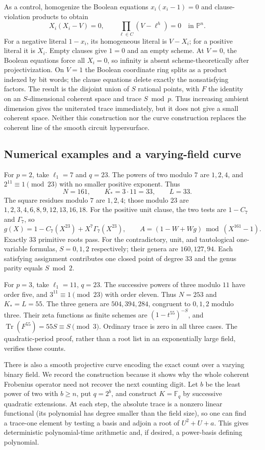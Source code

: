 As a control, homogenize the Boolean equations $x_i(x_i-1)=0$ and clause-violation products to obtain
\[
 X_i(X_i-V)=0,\qquad
 \prod_{\ell\in C}(V-\ell^h)=0
 \quad\text{in }\mathbb P^n.
\]
For a negative literal $1-x_i$, its homogeneous literal is $V-X_i$; for a positive literal it is $X_i$. Empty clauses give $1=0$ and an empty scheme. At $V=0$, the Boolean equations force all $X_i=0$, so infinity is absent scheme-theoretically after projectivization. On $V=1$ the Boolean coordinate ring splits as a product indexed by bit words; the clause equations delete exactly the nonsatisfying factors. The result is the disjoint union of $S$ rational points, with $F$ the identity on an $S$-dimensional coherent space and trace $S\bmod p$. Thus increasing ambient dimension gives the uniterated trace immediately, but it does not give a small coherent space. Neither this construction nor the curve construction replaces the coherent line of the smooth circuit hypersurface.

\subsection{Numerical examples and a varying-field curve}
For $p=2$, take $\ell_1=7$ and $q=23$. The powers of two modulo $7$ are $1,2,4$, and $2^{11}\equiv1\pmod{23}$ with no smaller positive exponent. Thus
\[
 N=161,\qquad K_*=3\cdot11=33,\qquad L=33.
\]
The square residues modulo $7$ are $1,2,4$; those modulo $23$ are
$1,2,3,4,6,8,9,12,13,16,18$.
For the positive unit clause, the two tests are $1-C_7$ and $\Gamma_7$, so
\[
 g(X)=1-C_7(X^{23})+X^7\Gamma_7(X^{23}),\qquad
 A=(1-W+Wg)\bmod(X^{161}-1).
\]
Exactly $33$ primitive roots pass. For the contradictory, unit, and tautological one-variable formulas, $S=0,1,2$ respectively; their genera are $160,127,94$. Each satisfying assignment contributes one closed point of degree $33$ and the genus parity equals $S\bmod2$.

For $p=3$, take $\ell_1=11$, $q=23$. The successive powers of three modulo $11$ have order five, and $3^{11}\equiv1\pmod{23}$ with order eleven. Thus $N=253$ and $K_*=L=55$. The three genera are $504,394,284$, congruent to $0,1,2$ modulo three. Their zeta functions as finite schemes are $(1-t^{55})^{-S}$, and $\operatorname{Tr}(F^{55})=55S\equiv S\pmod3$. Ordinary trace is zero in all three cases. The quadratic-period proof, rather than a root list in an exponentially large field, verifies these counts.

There is also a smooth projective curve encoding the exact count over a varying binary field. We record the construction because it shows why the whole coherent Frobenius operator need not recover the next counting digit. Let $b$ be the least power of two with $b\geq n$, put $q=2^b$, and construct $K=\mathbb F_q$ by successive quadratic extensions. At each step, the absolute trace is a nonzero linear functional (its polynomial has degree smaller than the field size), so one can find a trace-one element by testing a basis and adjoin a root of $U^2+U+a$. This gives deterministic polynomial-time arithmetic and, if desired, a power-basis defining polynomial.

